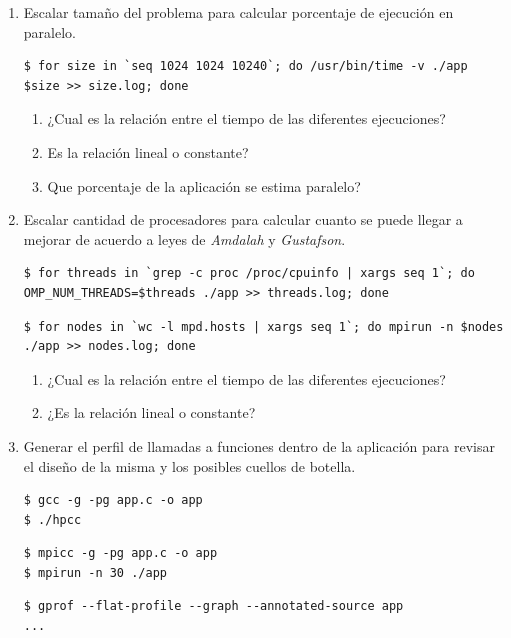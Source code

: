 \documentclass[a4paper]{report}
\begin{document}
\begin{enumerate}
\item Escalar tamaño del problema para calcular porcentaje de ejecución en paralelo.

\begin{lstlisting}
$ for size in `seq 1024 1024 10240`; do /usr/bin/time -v ./app $size >> size.log; done
\end{lstlisting}

\begin{enumerate}
\item ¿Cual es la relación entre el tiempo de las diferentes ejecuciones?
\item Es la relación lineal o constante?
\item Que porcentaje de la aplicación se estima paralelo?
\end{enumerate}

\item Escalar cantidad de procesadores para calcular cuanto se puede llegar a mejorar de acuerdo a leyes de {\it Amdalah} y {\it Gustafson}.

\begin{lstlisting}
$ for threads in `grep -c proc /proc/cpuinfo | xargs seq 1`; do OMP_NUM_THREADS=$threads ./app >> threads.log; done
\end{lstlisting}

\begin{lstlisting}
$ for nodes in `wc -l mpd.hosts | xargs seq 1`; do mpirun -n $nodes ./app >> nodes.log; done
\end{lstlisting}

\begin{enumerate}
\item ¿Cual es la relación entre el tiempo de las diferentes ejecuciones?
\item ¿Es la relación lineal o constante?
\end{enumerate}

\item Generar el perfil de llamadas a funciones dentro de la aplicación para revisar el diseño de la misma y los posibles cuellos de botella.

\begin{lstlisting}
$ gcc -g -pg app.c -o app
$ ./hpcc
\end{lstlisting}

\begin{lstlisting}
$ mpicc -g -pg app.c -o app
$ mpirun -n 30 ./app
\end{lstlisting}

\begin{lstlisting}
$ gprof --flat-profile --graph --annotated-source app
...
\end{lstlisting}


\end{enumerate}
\end{document}
